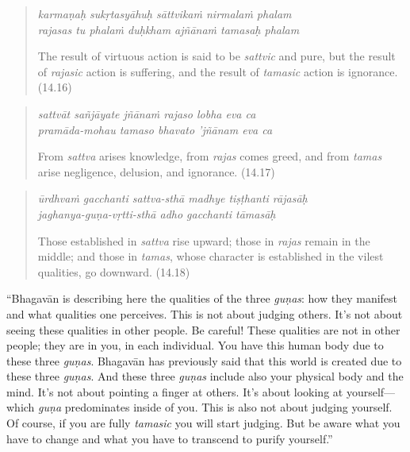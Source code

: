 \documentclass[12pt, twoside, openright]{memoir}
\begin{document}
\par
\begin{verse}
\textit{karmaṇaḥ sukṛtasyāhuḥ sāttvikaṁ nirmalaṁ phalam} \\
\textit{rajasas tu phalaṁ duḥkham ajñānaṁ tamasaḥ phalam}

\noindent The result of virtuous action is said to be \textit{sattvic} and pure, but the result of \textit{rajasic} action is suffering, and the result of \textit{tamasic} action is ignorance. (14.16)
\end{verse}
\par



\par
\begin{verse}
\textit{sattvāt sañjāyate jñānaṁ rajaso lobha eva ca} \\
\textit{pramāda-mohau tamaso bhavato ’jñānam eva ca}

\noindent From \textit{sattva} arises knowledge, from \textit{rajas} comes greed, and from \textit{tamas} arise negligence, delusion, and ignorance. (14.17)
\end{verse}
\par



\par
\begin{verse}
\textit{ūrdhvaṁ gacchanti sattva-sthā madhye tiṣṭhanti rājasāḥ} \\
\textit{jaghanya-guṇa-vṛtti-sthā adho gacchanti tāmasāḥ}

\noindent Those established in \textit{sattva} rise upward; those in \textit{rajas} remain in the middle; and those in \textit{tamas}, whose character is established in the vilest qualities, go downward. (14.18)
\end{verse}
\par


\enquote{Bhagavān is describing here the qualities of the three \textit{guṇas}: how they manifest and what qualities one perceives. This is not about judging others. It’s not about seeing these qualities in other people. Be careful! These qualities are not in other people; they are in you, in each individual. You have this human body due to these three \textit{guṇas}. Bhagavān has previously said that this world is created due to these three \textit{guṇas}. And these three \textit{guṇas} include also your physical body and the mind. It’s not about pointing a finger at others. It’s about looking at yourself---which \textit{guṇa} predominates inside of you. This is also not about judging yourself. Of course, if you are fully \textit{tamasic} you will start judging. But be aware what you have to change and what you have to transcend to purify yourself.}
\end{document}

